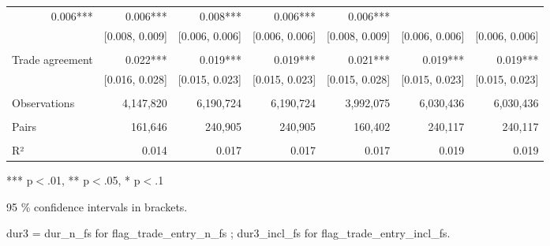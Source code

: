 \begin{table}[!h]
\begin{tabular}{lllllll}
  \multicolumn{1}{r}{0.006***} &
  \multicolumn{1}{r}{0.006***} &
  \multicolumn{1}{r}{0.008***} &
  \multicolumn{1}{r}{0.006***} &
  \multicolumn{1}{r}{0.006***} \\
\multicolumn{1}{l}{} &
  \multicolumn{1}{|r}{[0.008,   0.009]} &
  \multicolumn{1}{r}{[0.006,   0.006]} &
  \multicolumn{1}{r}{[0.006,   0.006]} &
  \multicolumn{1}{r}{[0.008,   0.009]} &
  \multicolumn{1}{r}{[0.006,   0.006]} &
  \multicolumn{1}{r}{[0.006,   0.006]} \\
\multicolumn{1}{l}{} &
  \multicolumn{1}{|r}{} &
  \multicolumn{1}{r}{} &
  \multicolumn{1}{r}{} &
  \multicolumn{1}{r}{} &
  \multicolumn{1}{r}{} &
  \multicolumn{1}{r}{} \\
\multicolumn{1}{l}{Trade agreement} &
  \multicolumn{1}{|r}{0.022***} &
  \multicolumn{1}{r}{0.019***} &
  \multicolumn{1}{r}{0.019***} &
  \multicolumn{1}{r}{0.021***} &
  \multicolumn{1}{r}{0.019***} &
  \multicolumn{1}{r}{0.019***} \\
\multicolumn{1}{l}{} &
  \multicolumn{1}{|r}{[0.016,   0.028]} &
  \multicolumn{1}{r}{[0.015,   0.023]} &
  \multicolumn{1}{r}{[0.015,   0.023]} &
  \multicolumn{1}{r}{[0.015,   0.028]} &
  \multicolumn{1}{r}{[0.015,   0.023]} &
  \multicolumn{1}{r}{[0.015,   0.023]} \\
\multicolumn{1}{l}{} &
  \multicolumn{1}{|r}{} &
  \multicolumn{1}{r}{} &
  \multicolumn{1}{r}{} &
  \multicolumn{1}{r}{} &
  \multicolumn{1}{r}{} &
  \multicolumn{1}{r}{} \\
\multicolumn{1}{l}{Observations} &
  \multicolumn{1}{|r}{4,147,820} &
  \multicolumn{1}{r}{6,190,724} &
  \multicolumn{1}{r}{6,190,724} &
  \multicolumn{1}{r}{3,992,075} &
  \multicolumn{1}{r}{6,030,436} &
  \multicolumn{1}{r}{6,030,436} \\
\multicolumn{1}{l}{} &
  \multicolumn{1}{|r}{} &
  \multicolumn{1}{r}{} &
  \multicolumn{1}{r}{} &
  \multicolumn{1}{r}{} &
  \multicolumn{1}{r}{} &
  \multicolumn{1}{r}{} \\
\multicolumn{1}{l}{Pairs} &
  \multicolumn{1}{|r}{161,646} &
  \multicolumn{1}{r}{240,905} &
  \multicolumn{1}{r}{240,905} &
  \multicolumn{1}{r}{160,402} &
  \multicolumn{1}{r}{240,117} &
  \multicolumn{1}{r}{240,117} \\
\multicolumn{1}{l}{} &
  \multicolumn{1}{|r}{} &
  \multicolumn{1}{r}{} &
  \multicolumn{1}{r}{} &
  \multicolumn{1}{r}{} &
  \multicolumn{1}{r}{} &
  \multicolumn{1}{r}{} \\
\multicolumn{1}{l}{R²} &
  \multicolumn{1}{|r}{0.014} &
  \multicolumn{1}{r}{0.017} &
  \multicolumn{1}{r}{0.017} &
  \multicolumn{1}{r}{0.017} &
  \multicolumn{1}{r}{0.019} &
  \multicolumn{1}{r}{0.019} \\
\cline{1-7}
\end{tabular}

\footnotesize{
*** p$<$.01, ** p$<$.05, * p$<$.1

95 \% confidence intervals in brackets.

dur3 = dur\_n\_fs for flag\_trade\_entry\_n\_fs ; dur3\_incl\_fs for flag\_trade\_entry\_incl\_fs.
}
\end{table}
